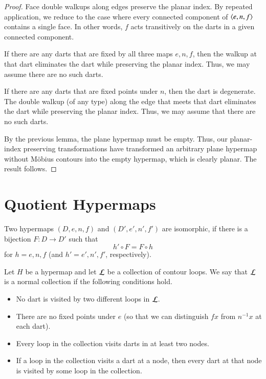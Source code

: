 \begin{proof}  Face double walkups along edges preserve the planar
index.  By repeated application, we reduce to the case where every
connected component of $\langle e,n,f\rangle$ contains a single face. In
other words, $f$ acts transitively on the darts in a given connected
component.

If there are any darts that are fixed by all three maps $e,n,f$,
then the walkup at that dart eliminates the dart while preserving
the planar index.  Thus, we may assume there are no such darts.

If there are any darts that are fixed points under $n$, then the
dart is degenerate.  The double walkup (of any type) along the edge
that meets that dart eliminates the dart while preserving the planar
index.  Thus, we may assume that there are no such darts.

By the previous lemma, the plane hypermap must be empty.  Thus, our
planar-index preserving transformations have transformed an
arbitrary plane hypermap without M\"obius contours into the empty
hypermap, which is clearly planar.  The result follows.
\end{proof}

\section{Quotient Hypermaps}


\begin{definition} Two hypermaps $(D,e,n,f)$ and $(D',e',n',f')$ are
isomorphic, if there is a bijection $F:D\to D'$ such that
    $$h'\circ F = F\circ h$$
for $h=e,n,f$ (and $h'=e',n',f'$, respectively).
\end{definition}


\begin{definition}
Let $H$ be a hypermap and let $\cal L$ be a collection of contour
loops.  We say that $\cal L$ is a normal collection if the following
conditions hold. \begin{itemize}
 \item No dart is visited by two different loops in $\cal
L$.
 \item There are no fixed points under $e$ (so that we can distinguish $f x$
from $n^{-1} x$ at each dart).
 \item Every loop in the
collection visits darts in at least two nodes.
 \item If a loop in the
 collection visits a dart at a node, then every dart at that node is
 visited by some loop in the collection.
\end{itemize}
\end{definition}

